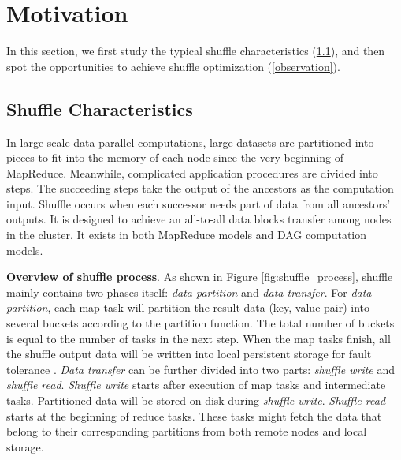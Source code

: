 \section{Motivation}

In this section, we first study the typical shuffle characteristics (\ref{shuffle pattern}), and then spot the opportunities to achieve shuffle optimization (\ref{observation}).
\subsection{Shuffle Characteristics} \label{shuffle pattern}

In large scale data parallel computations, large datasets are partitioned into pieces to fit into the memory of each node since the very beginning of MapReduce\cite{mapreduce}.
Meanwhile, complicated application procedures are divided into steps. The succeeding steps take the output of the ancestors as the computation input. 
Shuffle occurs when each successor needs 
part of data from all ancestors' outputs. 
It is designed to achieve an all-to-all data blocks transfer among nodes in the cluster. It exists in both MapReduce models and DAG computation models.


\textbf{Overview of shuffle process}. As shown in Figure \ref{fig:shuffle_process}, shuffle mainly contains two phases itself: \textit{data partition} and \textit{data transfer}. For \textit{data partition}, each map task will partition the result data (key, value pair) into several buckets according to the partition function.
The total number of buckets is equal to the number of tasks in the next step. When the map tasks finish, all the shuffle output data will be written into local persistent storage for fault tolerance \cite{mapreduce, spark}.
\textit{Data transfer} can be further divided into two parts: \textit{shuffle write} and \textit{shuffle read}. \textit{Shuffle write} starts after execution of map tasks and intermediate tasks. Partitioned data will  be stored on disk during \textit{shuffle write}. \textit{Shuffle read} starts at the beginning of reduce tasks. These tasks might fetch the data that belong to their corresponding partitions from both remote nodes and local storage.


